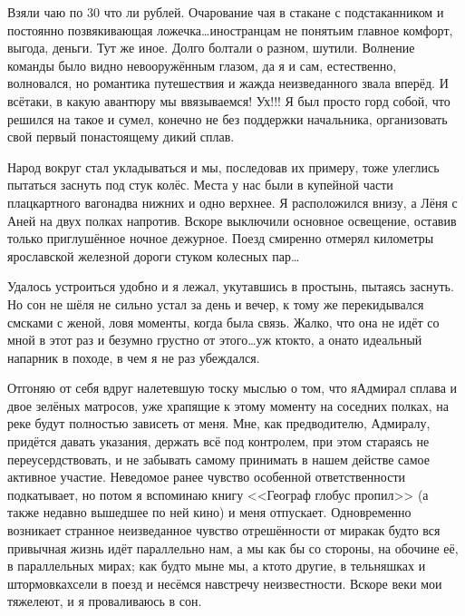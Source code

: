 Взяли чаю по 30 что ли рублей. Очарование чая в стакане с подстаканником и постоянно позвякивающая ложечка\ldots иностранцам не понять\mdash им главное комфорт, выгода, деньги. Тут же иное. Долго болтали о разном, шутили. Волнение команды было видно невооружённым глазом, да я и сам, естественно, волновался, но романтика путешествия и жажда неизведанного звала вперёд. И всё\sdash таки, в какую авантюру мы ввязываемся! Ух!!! Я был просто горд собой, что решился на такое и сумел, конечно не без поддержки начальника, организовать свой первый по\sdash настоящему дикий сплав. 

Народ вокруг стал укладываться и мы, последовав их примеру, тоже улеглись пытаться заснуть под стук колёс. Места у нас были в купейной части плацкартного вагона\mdash два нижних и одно верхнее. Я расположился внизу, а Лёня с Аней на двух полках напротив. Вскоре выключили основное освещение, оставив только приглушённое ночное дежурное. Поезд смиренно отмерял километры ярославской железной дороги стуком колесных пар\ldots

Удалось устроиться удобно и я лежал, укутавшись в простынь, пытаясь заснуть. Но сон не шёл\mdash я не сильно устал за день и вечер, к тому же перекидывался смс\sdash ками с женой, ловя моменты, когда была связь. Жалко, что она не идёт со мной в этот раз и безумно грустно от этого\ldots уж кто\sdash кто, а она\sdash то идеальный напарник в походе, в чем я не раз убеждался.
 
Отгоняю от себя вдруг налетевшую тоску мыслью о том, что я\mdash Адмирал сплава и двое зелёных матросов, уже храпящие к этому моменту на соседних полках, на реке будут полностью зависеть от меня. Мне, как предводителю, Адмиралу, придётся давать указания, держать всё под контролем, при этом стараясь не переусердствовать, и не забывать самому принимать в нашем действе самое активное участие. Неведомое ранее чувство особенной ответственности подкатывает, но потом я вспоминаю книгу <<Географ глобус пропил>> \cite{ГеографГлобусПропил} (а также недавно вышедшее по ней кино) и меня отпускает. Одновременно возникает странное неизведанное чувство отрешённости от мира\mdash как будто вся привычная жизнь идёт параллельно нам, а мы как бы со стороны, на обочине её, в параллельных мирах; как будто мы\mdash не мы, а кто\sdash то другие, в тельняшках и штормовках\mdash сели в поезд и несёмся навстречу неизвестности. Вскоре веки мои тяжелеют, и я проваливаюсь в сон.

\begin{center}
\end{center}